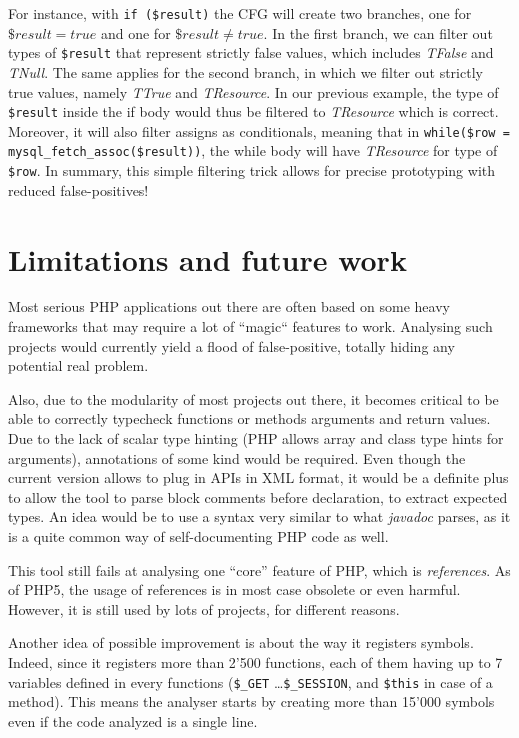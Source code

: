 \documentclass[a4paper]{article}
\begin{document}
For instance, with \verb/if ($result)/ the CFG will create two branches, one
for $\$result = true$ and one for $\$result \neq true$. In the first branch, we
can filter out types of \verb/$result/ that represent strictly false values,
which includes \emph{TFalse} and \emph{TNull}. The same applies for the second
branch, in which we filter out strictly true values, namely \emph{TTrue} and
\emph{TResource}. In our previous example, the type of \verb/$result/ inside
the if body would thus be filtered to \emph{TResource} which is correct.
Moreover, it will also filter assigns as conditionals, meaning that in 
\verb/while($row = mysql_fetch_assoc($result))/, the while body will have
\emph{TResource} for type of \verb/$row/. In summary, this simple filtering
trick allows for precise prototyping with reduced false-positives!

\section{Limitations and future work}
Most serious PHP applications out there are often based on some heavy frameworks
that may require a lot of ``magic`` features to work. Analysing such projects
would currently yield a flood of false-positive, totally hiding any potential
real problem.

Also, due to the modularity of most projects out there, it becomes critical to
be able to correctly typecheck functions or methods arguments and return values.
Due to the lack of scalar type hinting (PHP allows array and class type hints
for arguments), annotations of some kind would be required. Even though the
current version allows to plug in APIs in XML format, it would be a definite
plus to allow the tool to parse block comments before declaration, to extract
expected types. An idea would be to use a syntax very similar to what
\emph{javadoc} parses, as it is a quite common way of self-documenting PHP
code as well.

This tool still fails at analysing one ``core'' feature of PHP, which is
\emph{references}. As of PHP5, the usage of references is in most case obsolete
or even harmful. However, it is still used by lots of projects, for different
reasons.

Another idea of possible improvement is about the way it registers symbols.
Indeed, since it registers more than 2'500 functions, each of them having up to
7 variables defined in every functions (\verb/$_GET/ \ldots \verb/$_SESSION/,
and \verb/$this/ in case of a method). This means the analyser starts by
creating more than 15'000 symbols even if the code analyzed is a single line.
\end{document}
